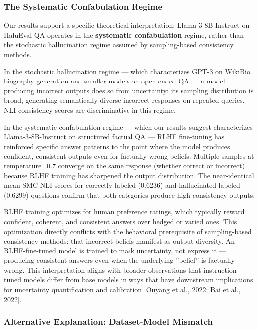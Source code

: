 
\subsubsection{The Systematic Confabulation Regime}

Our results support a specific theoretical interpretation: Llama-3-8B-Instruct on HaluEval QA operates in the \textbf{systematic confabulation} regime, rather than the stochastic hallucination regime assumed by sampling-based consistency methods.

In the stochastic hallucination regime --- which characterizes GPT-3 on WikiBio biography generation \citep{Manakul2023SelfCheckGPT} and smaller models on open-ended QA \citep{Kuhn2023Semantic} --- a model producing incorrect outputs does so from uncertainty: its sampling distribution is broad, generating semantically diverse incorrect responses on repeated queries. NLI consistency scores are discriminative in this regime.

In the systematic confabulation regime --- which our results suggest characterizes Llama-3-8B-Instruct on structured factual QA --- RLHF fine-tuning has reinforced specific answer patterns to the point where the model produces confident, consistent outputs even for factually wrong beliefs. Multiple samples at temperature=0.7 converge on the same response (whether correct or incorrect) because RLHF training has sharpened the output distribution. The near-identical mean SMC-NLI scores for correctly-labeled (0.6236) and hallucinated-labeled (0.6299) questions confirm that both categories produce high-consistency outputs.

RLHF training optimizes for human preference ratings, which typically reward confident, coherent, and consistent answers over hedged or varied ones. This optimization directly conflicts with the behavioral prerequisite of sampling-based consistency methods: that incorrect beliefs manifest as output diversity. An RLHF-fine-tuned model is trained to mask uncertainty, not express it --- producing consistent answers even when the underlying ''belief'' is factually wrong. This interpretation aligns with broader observations that instruction-tuned models differ from base models in ways that have downstream implications for uncertainty quantification and calibration [Ouyang et al., 2022; Bai et al., 2022].

\subsubsection{Alternative Explanation: Dataset-Model Mismatch}

